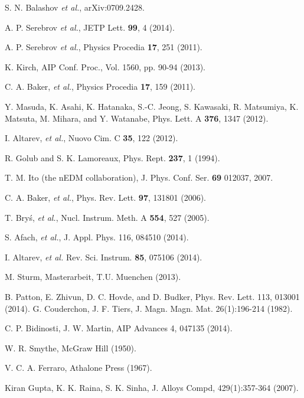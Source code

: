 \documentclass[review]{elsarticle}
\begin{document}

\begin{thebibliography}{00}

 S. N. Balashov {\it et al.}, arXiv:0709.2428.

 A. P. Serebrov {\it et al.}, JETP Lett. {\bf 99}, 4
  (2014).

 A. P. Serebrov {\it et al.}, Physics Procedia {\bf
  17}, 251 (2011).

 K. Kirch, AIP Conf. Proc., Vol. 1560, pp. 90-94
  (2013).

 C. A. Baker, {\it et al.}, Physics Procedia {\bf
  17}, 159 (2011).

 Y. Masuda, K. Asahi, K. Hatanaka, S.-C. Jeong,
  S. Kawasaki, R. Matsumiya, K. Matsuta, M. Mihara, and Y. Watanabe,
  Phys. Lett. A {\bf 376}, 1347 (2012).

 I. Altarev, {\it et al.}, Nuovo Cim. C {\bf
  35}, 122 (2012).

 R. Golub and S. K. Lamoreaux, Phys. Rept.  {\bf
  237}, 1 (1994).

 T. M. Ito (the nEDM collaboration),
  J. Phys. Conf. Ser. {\bf 69} 012037, 2007.

 C. A. Baker, {\it et al.}, Phys. Rev. Lett. {\bf
  97}, 131801 (2006).

 T. Bry\'s, {\it et al.}, Nucl. Instrum. Meth. A
  {\bf 554}, 527 (2005).

 S. Afach, {\it et al.}, J. Appl. Phys. 116, 084510 (2014).

 I. Altarev, {\it et al.}
  Rev. Sci. Instrum. {\bf 85}, 075106 (2014).

 M. Sturm, Masterarbeit, T.U. Muenchen (2013).

 B. Patton, E. Zhivun, D. C. Hovde, and D. Budker,
  Phys. Rev. Lett. 113, 013001 (2014).
 G. Couderchon, J. F. Tiers, J. Magn. Magn. Mat. 26(1):196-214 (1982).

 C. P. Bidinosti, J. W. Martin, AIP Advances 4, 047135 (2014).

 W. R. Smythe, McGraw Hill (1950).

 V. C. A. Ferraro, Athalone Press (1967).

 Kiran Gupta, K. K. Raina, S. K. Sinha, J. Alloys Compd, 429(1):357-364 (2007).


\end{thebibliography}
\end{document}
